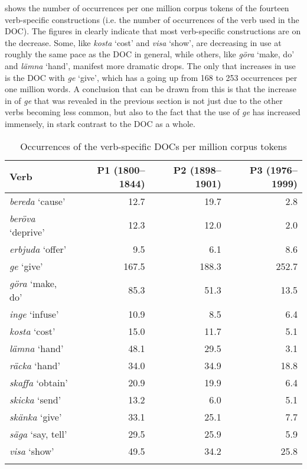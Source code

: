 \documentclass[output=paper]{langscibook}
\begin{document}
 shows the number of occurrences per one million corpus tokens of the fourteen verb-specific constructions (i.e. the number of occurrences of the verb used in the DOC). The figures in  clearly indicate that most verb-specific constructions are on the decrease. Some, like \textit{kosta} ‘cost’ and \textit{visa} ‘show’, are decreasing in use at roughly the same pace as the DOC in general, while others, like \textit{göra} ‘make, do’ and \textit{lämna} ‘hand’, manifest more dramatic drops. The only  that increases in use is the DOC with \textit{ge} ‘give’, which has a  going up from 168 to 253 occurrences per one million words. A conclusion that can be drawn from this is that the increase in  of \textit{ge} that was revealed in the previous section is not just due to the other verbs becoming less common, but also to the fact that the use of \textit{ge} has increased immensely, in stark contrast to the DOC as a whole.


\begin{table}
\caption{Occurrences of the verb-specific DOCs per million corpus tokens}
\label{tab:valdeson:6}
\begin{tabularx}{.9\textwidth}{lrrr}
\lsptoprule
Verb & P1 (1800–1844) & P2 (1898–1901) & P3 (1976–1999)\\
\midrule
\textit{bereda} ‘cause’ & 12.7 & 19.7 & 2.8\\
\textit{beröva} ‘deprive’ & 12.3 & 12.0 & 2.0\\
\textit{erbjuda} ‘offer’ & 9.5 & 6.1 & 8.6\\
\textit{ge} ‘give’ & 167.5 & 188.3 & 252.7\\
\textit{göra} ‘make, do’ & 85.3 & 51.3 & 13.5\\
\textit{inge} ‘infuse’ & 10.9 & 8.5 & 6.4\\
\textit{kosta} ‘cost’ & 15.0 & 11.7 & 5.1\\
\textit{lämna} ‘hand’ & 48.1 & 29.5 & 3.1\\
\textit{räcka} ‘hand’ & 34.0 & 34.9 & 18.8\\
\textit{skaffa} ‘obtain’ & 20.9 & 19.9 & 6.4\\
\textit{skicka} ‘send’ & 13.2 & 6.0 & 5.1\\
\textit{skänka} ‘give’ & 33.1 & 25.1 & 7.7\\
\textit{säga} ‘say, tell’ & 29.5 & 25.9 & 5.9\\
\textit{visa} ‘show’ & 49.5 & 34.2 & 25.8\\
\lspbottomrule
\end{tabularx}
\end{table}
\end{document}
